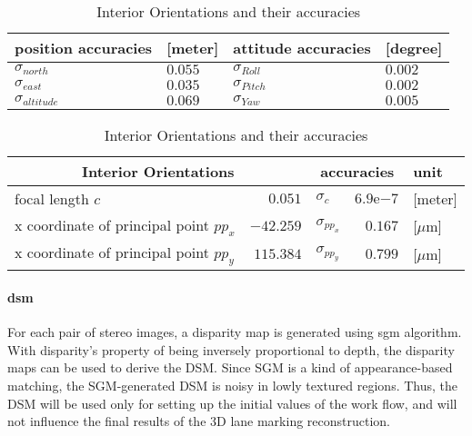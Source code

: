 \begin{table}%
    \centering
    \begin{tabular}{ll|ll}
    \toprule
    position accuracies  &[meter]  & attitude accuracies & [degree]\\
    \midrule
    $\sigma_{north}$     & $0.055$ & $\sigma_{Roll}$  & $0.002$\\
    $\sigma_{east}$      & $0.035$ & $\sigma_{Pitch}$ & $0.002$\\
    $\sigma_{altitude}$  & $0.069$ & $\sigma_{Yaw}$   & $0.005$\\
    \bottomrule
    \end{tabular}
    \caption{Accuracies of Exterior Orientations}
    \label{tab:EOaccuracy}
\vspace{1cm}
    \centering
    \begin{tabular}{lr|lr|l}
    \toprule
    \multicolumn{2}{c|}{Interior Orientations}  & \multicolumn{2}{c|}{accuracies} & unit\\
    \midrule
    focal length $c$                       &   $0.051$ & $\sigma_c$      & $6.9\mathrm{e}{-7}$ & [meter]\\
    x coordinate of principal point $pp_x$ & $-42.259$ & $\sigma_{pp_x}$ & $0.167$             &[$\mu$m]\\
    x coordinate of principal point $pp_y$ & $115.384$ & $\sigma_{pp_y}$ & $0.799$             &[$\mu$m]\\
    \bottomrule
    \end{tabular}
    \caption{Interior Orientations and their accuracies}
    \label{tab:IOaccuracy}
\end{table}

\paragraph{\gls{dsm}}
For each pair of stereo images, a disparity map is generated using \gls{sgm} algorithm. With disparity's property of being inversely proportional to depth, the disparity maps can be used to derive the DSM. Since SGM is a kind of appearance-based matching, the SGM-generated DSM is noisy in lowly textured regions. 
Thus, the DSM will be used only for setting up the initial values of the work flow, and will not influence the final results of the 3D lane marking reconstruction.

